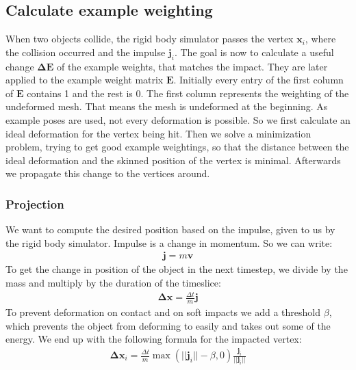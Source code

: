 \documentclass[
	11pt, 
	DIV10,
	a4paper, 
	oneside, 
	headings=normal, 
	captions=tableheading,
	final, 
	numbers=noenddot
]{scrartcl}
\begin{document}
\subsection{Calculate example weighting}
When two objects collide, the rigid body simulator passes the vertex $\bm{x}_i$, where the collision occurred and the impulse $\bm{j}_i$.
The goal is now to calculate a 	useful change $\bm{\Delta E}$ of the example weights, that matches the impact. They are later applied to the example weight matrix $\bm E$. Initially every entry of the first column of $\bm E$ contains 1 and the rest is 0. The first column represents the weighting of the undeformed mesh. That means the mesh is undeformed at the beginning. As example poses are used, not every deformation is possible. So we first calculate an ideal deformation for the vertex being hit. Then we solve a minimization problem, trying to get good example weightings, so that the distance between the ideal deformation and the skinned position of the vertex is minimal. Afterwards we propagate this change to the vertices around.
\subsubsection{Projection}
We want to compute the desired position based on the impulse, given to us by the rigid body simulator. Impulse is a change in momentum. So we can write:
\begin{align}
\bm j = m \bm v
\end{align}
To get the change in position of the object in the next timestep, we divide by the mass and multiply by the duration of the timeslice:
\begin{align}
\bm{\Delta x}= \frac{\Delta t}{m} \bm j
\end{align}
To prevent deformation on contact and on soft impacts we add a threshold $\beta$, which prevents the object from deforming to easily and takes out some of the energy. We end up with the following formula for the impacted vertex:
\begin{align}
\bm{\Delta x}_i = \frac{\Delta t}{m} \max(||\bm{j}_i|| - \beta, 0) \frac{\bm j_i}{||\bm j_i||}
\end{align}
\end{document}
